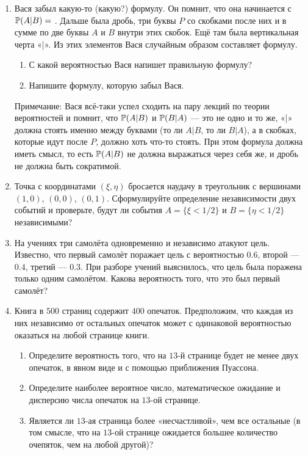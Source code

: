 \documentclass[12pt, a4paper]{article}\usepackage[]{graphicx}\usepackage[]{color}
\begin{document}
\begin{enumerate}



\item Вася забыл какую-то (какую?) формулу. Он помнит, что она начинается с $\P(A|B) = $ . Дальше была дробь, три буквы $P$ со скобками после них и в сумме по две буквы $A$ и $B$ внутри этих скобок. Ещё там была вертикальная черта «|». Из этих элементов Вася случайным образом составляет формулу.
\begin{enumerate}
\item С какой вероятностью Вася напишет правильную формулу?
\item Напишите формулу, которую забыл Вася.
\end{enumerate}

Примечание: Вася всё-таки успел сходить на пару лекций по теории вероятностей и помнит, что $\P(A|B)$ и $\P(B|A)$ — это не одно и то же, «|» должна стоять именно между буквами (то ли $A|B$, то ли $B|A$), а в скобках, которые идут после $P$, должно хоть что-то стоять. При этом формула должна иметь смысл, то есть  $\P(A|B)$   не должна выражаться через себя же, и дробь не должна быть сократимой.

\item Точка с координатами $(\xi, \eta)$ бросается наудачу в треугольник с вершинами $(1,0)$, $(0,0)$, $(0,1)$.  Сформулируйте определение независимости двух событий и проверьте, будут ли события $A=\{ \xi < 1/2 \}$  и $B=\{ \eta < 1/2 \}$  независимыми?

\item На учениях три самолёта одновременно и независимо атакуют цель. Известно, что первый самолёт поражает цель с вероятностью $0.6$, второй — $0.4$, третий — $0.3$. При разборе учений выяснилось, что цель была поражена только одним самолётом. Какова вероятность того, что это был первый самолёт?

\item Книга в $500$ страниц содержит $400$ опечаток. Предположим, что каждая из них независимо от остальных опечаток может с одинаковой вероятностью оказаться на любой странице книги.
\begin{enumerate}

\item Определите вероятность того, что на $13$-й странице будет не менее двух опечаток, в явном виде и с помощью приближения Пуассона.
\item Определите наиболее вероятное число, математическое ожидание и дисперсию числа опечаток на $13$-ой странице.
\item Является ли $13$-ая страница более «несчастливой», чем все остальные (в том смысле, что на $13$-ой странице ожидается большее количество очепяток, чем на любой другой)?
\end{enumerate}


\end{enumerate}
\end{document}
